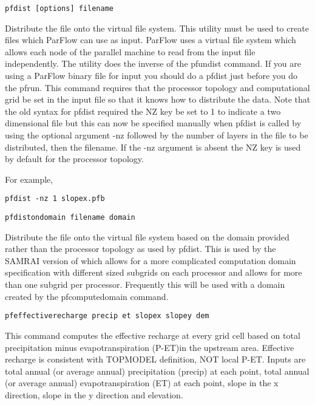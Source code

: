 \begin{description}
\item{\begin{verbatim}pfdist [options] filename \end{verbatim}}
Distribute the file onto the virtual file system. This utility must be used to
create files which ParFlow can use as input. ParFlow uses a virtual file system
which allows each node of the parallel machine to read from the input file independently.
The utility does the inverse of the pfundist command. If you are using a ParFlow binary
file for input you should do a pfdist just before you do the pfrun. This command
requires that the processor topology and computational grid be set in the input
file so that it knows how to distribute the data. Note that the old syntax for
pfdist required the NZ key be set to 1 to indicate a two dimensional file but this can now be
specified manually when pfdist is called by using the optional argument -nz followed by the
number of layers in the file to be distributed, then the filename.
If the -nz argument is absent the NZ key is used by default for the processor topology.

For example,
\begin{display}
\begin{verbatim}
pfdist -nz 1 slopex.pfb
\end{verbatim}
\end{display}

\item{\begin{verbatim}pfdistondomain filename domain\end{verbatim}}
 Distribute the file onto the virtual file system based on the domain
 provided rather than the processor topology as used by pfdist.  This
 is used by the SAMRAI version of which allows for a more complicated
 computation domain specification with different sized subgrids on
 each processor and allows for more than one subgrid per processor.
  Frequently this will be used with a domain created by the
 pfcomputedomain command.


\item{\begin{verbatim}pfeffectiverecharge precip et slopex slopey dem\end{verbatim}}
This command computes the effective recharge at every grid cell based on total precipitation
minus evapotranspiration (P-ET)in the upstream area. Effective recharge is consistent with TOPMODEL
definition, NOT local P-ET.   Inputs are total annual (or average annual) precipitation (precip) at each point,
total annual (or average annual) evapotranspiration (ET) at each point, slope in the x
direction, slope in the y direction and elevation.


\end{description}
